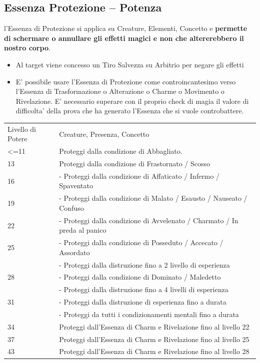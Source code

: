 \documentclass[a4paper,11pt,twoside,openany]{dndbook}
\begin{document}
\pagebreak

\subsection{Essenza Protezione -- Potenza}

\label{essenza-protezione---potenza}

l'Essenza di Protezione si applica su Creature, Elementi, Concetto e \textbf{permette di schermare o annullare gli effetti magici e non che altererebbero il nostro corpo}.

\begin{itemize}
\item 
Al target viene concesso un Tiro Salvezza su Arbitrio per negare gli
effetti 
\item 
E' possibile usare l'Essenza di Protezione come controincantesimo verso l'Essenza di Trasformazione o Alterazione o Charme o Movimento o Rivelazione. E' necessario superare con il proprio check di magia il valore di difficolta' della prova che ha generato l'Essenza che si vuole controbattere. 
\end{itemize}

\bigskip

\begin{tabular}[c]{@{}ll@{}}
\toprule 
Livello di Potere & Creature, Presenza, Concetto\tabularnewline
\textless=11 & Proteggi dalla condizione di Abbagliato.\tabularnewline
13 & Proteggi dalla condizione di Frastornato / Scosso\tabularnewline
16 & - Proteggi dalla condizione di Affaticato / Infermo / Spaventato\tabularnewline
19 & - Proteggi dalla condizione di Malato / Esausto / Nauseato / Confuso\tabularnewline
22 & - Proteggi dalla condizione di Avvelenato / Charmato / In preda al panico\tabularnewline
25 & - Proteggi dalla condizione di Posseduto / Accecato / Assordato
\\
&- Proteggi dalla distruzione fino a 2 livello di esperienza
\\
28 &- Proteggi dalla condizione di Dominato / Maledetto
\\
&- Proteggi dalla distruzione fino a 4 livelli di esperienza
\\
31 &- Proteggi dalla distruzione di esperienza fino a durata
\\
&- Proteggi da tutti i condizionamenti mentali fino a durata
\\
34 & Proteggi dall'Essenza di Charm e Rivelazione fino al livello 22\tabularnewline
37 & Proteggi dall'Essenza di Charm e Rivelazione fino al livello 25\tabularnewline
43 & Proteggi dall'Essenza di Charm e Rivelazione fino al livello 28\tabularnewline
\bottomrule
\end{tabular}
\end{document}
